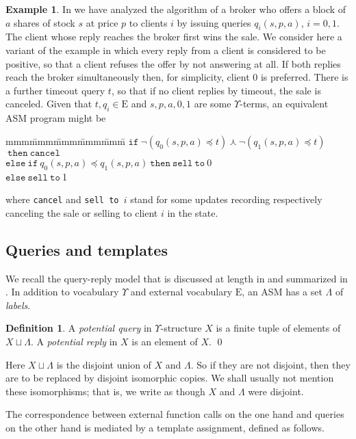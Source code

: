 \documentclass{LMCS}
\theoremstyle{definition}
\newtheorem{df}[thm]{Definition}
\newtheorem{ex}[thm]{Example}
\newenvironment{eatab}
 {\bigskip\noindent\begin{minipage}{\textwidth}\upshape\ttfamily
  \begin{tabbing}mmm\=mmm\=mmm\=mmm\=mmm\=\kill}
 {\end{tabbing}\end{minipage}\bigskip}
\newcommand{\E}{\mathrm{E}}
\newcommand{\U}{\Upsilon}
\newcommand{\kand}{\curlywedge}
\newcommand{\ttt}[1]{\ensuremath{\mathtt {#1}}}
\begin{document}
\begin{ex} \label{ex:broker} In \cite{ga1} we have analyzed the
algorithm of a broker who offers a block of $a$ shares of stock $s$
at price $p$ to clients $i$ by issuing queries $q_i(s,p,a)$,
$i=0,1$. The client whose reply reaches the broker first wins the
sale. We consider here a variant of the example in which every reply
from a client is considered to be positive, so that a client refuses
the offer by not answering at all. If both replies reach the broker
simultaneously then, for simplicity, client 0 is preferred. There is
a further timeout query $t$, so that if no client replies by
timeout, the sale is canceled. Given that $t, q_i \in \E$
and $s,p,a,0,1$ are some $\U$-terms, an equivalent ASM program
might be

\begin{eatab}
  \>\>\ttt{if\ }$\neg(q_0(s,p,a) \preceq t) \kand\neg( q_1(s,p,a)
  \preceq t)$
  \ttt{\ then\ cancel}\\
  \>\>\ttt{else\ if\ }$q_0(s,p,a) \preceq q_1(s,p,a)$\ttt{\ then\ sell\ to\ }0\\
  \>\>\ttt{else\ sell\ to\ }1
\end{eatab}

\noindent where \texttt{cancel} and \texttt{sell to }$i$ stand for
some updates recording respectively canceling the sale or selling to
client $i$ in the state.
\end{ex}


\subsection{Queries and templates}

We recall the query-reply model that is discussed at length in
\cite{oa1,oa2} and summarized in \cite{ga1}.  In addition to vocabulary
$\U$ and external vocabulary $\E$, an ASM has a set $\Lambda$ of
\emph{labels}.

\begin{df}
A \emph{potential query} in $\U$-structure $X$ is a finite
tuple of elements of $X\sqcup\Lambda$.  A \emph{potential reply} in
$X$ is an element of $X$. \qed\end{df}

Here $X\sqcup\Lambda$ is the disjoint union of $X$ and $\Lambda$.
So if they are not disjoint, then they are to be replaced by
disjoint isomorphic copies.  We shall usually not mention these
isomorphisms; that is, we write as though $X$ and $\Lambda$ were
disjoint.

The correspondence between external function calls on the one hand
and queries on the other hand is mediated by a template assignment,
defined as follows.
\end{document}
